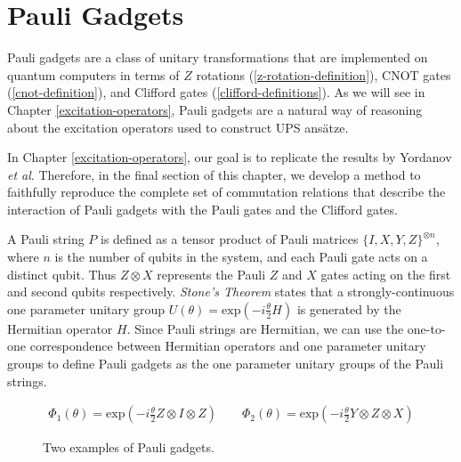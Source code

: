 \chapter{Pauli Gadgets}%
\label{pauli-gadgets}

Pauli gadgets are a class of unitary transformations that are implemented on quantum computers in terms of $Z$ rotations (\ref{z-rotation-definition}), CNOT gates (\ref{cnot-definition}), and Clifford gates (\ref{clifford-definitions}). As we will see in Chapter \ref{excitation-operators}, Pauli gadgets are a natural way of reasoning about the excitation operators used to construct UPS ansätze.

In Chapter \ref{excitation-operators}, our goal is to replicate the results by Yordanov \textit{et al}. Therefore, in the final section of this chapter, we develop a method to faithfully reproduce the complete set of commutation relations that describe the interaction of Pauli gadgets with the Pauli gates and the Clifford gates.

A Pauli string $P$ is defined as a tensor product of Pauli matrices $\{I, X, Y, Z\}^{\otimes n}$, where $n$ is the number of qubits in the system, and each Pauli gate acts on a distinct qubit. Thus $Z \otimes X$ represents the Pauli $Z$ and $X$ gates acting on the first and second qubits respectively. \textit{Stone's Theorem} \cite{Stone1932} states that a strongly-continuous one parameter unitary group $U(\theta) = \text{exp} \left(- i \frac{\theta}{2} H \right)$ is generated by the Hermitian operator $H$. Since Pauli strings are Hermitian, we can use the one-to-one correspondence between Hermitian operators and one parameter unitary groups to define Pauli gadgets as the one parameter unitary groups of the Pauli strings.

\begin{figure}[H]
    \centering
    \begin{gather*}
        \Phi_1(\theta) = \text{exp}\left(- i \frac{\theta}{2} Z \otimes I \otimes Z \right) \qquad
        \Phi_2(\theta) = \text{exp}\left(- i \frac{\theta}{2} Y \otimes Z \otimes X \right)%
    \end{gather*}
    \caption{Two examples of Pauli gadgets.}
\end{figure}
